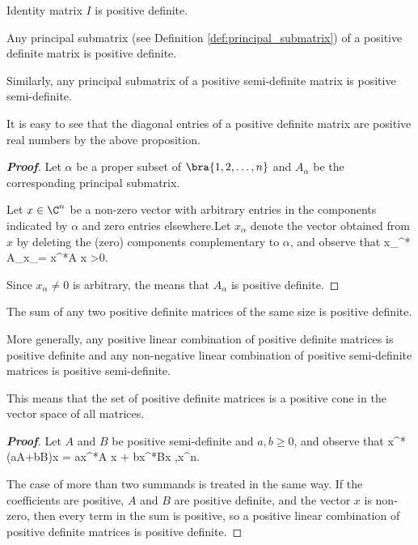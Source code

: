 \begin{example}
Identity matrix $I$ is positive definite.
\end{example}

\begin{proposition}\label{pro:positive_definite_principal_submatrix_is_positive_definite}
Any principal submatrix (see Definition \ref{def:principal_submatrix}) of a positive definite matrix is positive definite.

Similarly, any principal submatrix of a positive semi-definite matrix is positive semi-definite.
\end{proposition}

\begin{remark}
It is easy to see that the diagonal entries of a positive definite matrix are positive real numbers by the above proposition.
\end{remark}

\begin{proof}[\bf Proof]
Let $\alpha$ be a proper subset of $\bra{1,2,\dots,n}$ and $A_{\alpha}$ be the corresponding principal submatrix.

Let $x\in\C^n$ be a non-zero vector with arbitrary entries in the components indicated by $\alpha$ and zero entries elsewhere.Let $x_\alpha$ denote the vector obtained from $x$ by deleting the
(zero) components complementary to $\alpha$, and observe that
\be
x_\alpha^* A_\alpha x_\alpha = x^*A x >0.
\ee

Since $x_\alpha \neq 0$ is arbitrary, the means that $A_\alpha$ is positive definite.
\end{proof}

\begin{proposition}
The sum of any two positive definite matrices of the same size is positive definite.

More generally, any positive linear combination of positive definite matrices is positive definite and any
non-negative linear combination of positive semi-definite matrices is positive semi-definite.
\end{proposition}

\begin{remark}
This means that the set of positive definite matrices is a positive cone in the vector space of all matrices.
\end{remark}

\begin{proof}[\bf Proof]
Let $A$ and $B$ be positive semi-definite and $a,b\geq 0$, and observe that
\be
x^*(aA+bB)x = ax^*A x + bx^*Bx ,\qquad \forall x\in \C^n.
\ee

The case of more than two summands is treated in the same way. If the coefficients are positive, $A$ and $B$ are positive definite, and the vector $x$ is non-zero, then every term in the sum is
positive, so a positive linear combination of positive definite matrices is positive definite.
\end{proof}

